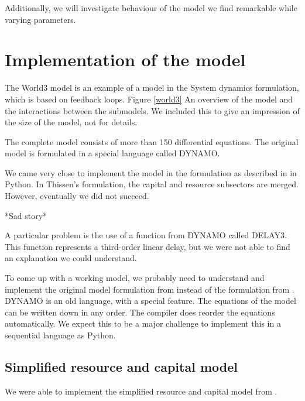 \documentclass[10pt,a4paper]{scrartcl}
\begin{document}
Additionally, we will investigate behaviour of the model we find remarkable while varying parameters.

\section*{Implementation of the model}

The World3 model is an example of a model in the System dynamics formulation, which is based on feedback loops. Figure \ref{world3} An overview of the model and the interactions between the submodels. We included this to give an impression of the size of the model, not for details.


The complete model consists of more than 150 differential equations. The original model is formulated in a special language called DYNAMO.

We came very close to implement the model in the formulation as described in \cite{thissen1978investigations} in Python. In Thissen's formulation, the capital and resource subsectors are merged. However, eventually we did not succeed.

*Sad story*

A particular problem is the use of a function from DYNAMO called DELAY3. This function represents a third-order linear delay, but we were not able to find an explanation we could understand.

To come up with a working model, we probably need to understand and implement the original model formulation from \cite{forresterworld} instead of the formulation from \cite{thissen1978investigations}. DYNAMO is an old language, with a special feature. The equations of the model can be written down in any order. The compiler does reorder the equations automatically. We expect this to be a major challenge to implement this in a sequential language as Python.

\subsection*{Simplified resource and capital model}

We were able to implement the simplified resource and capital model from \cite{thissen1978investigations}.
\end{document}
